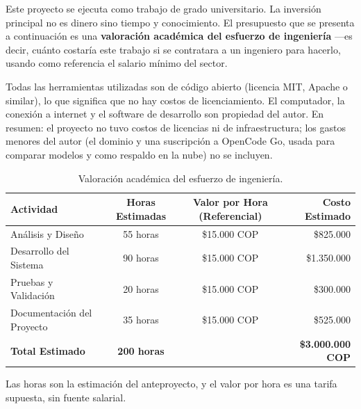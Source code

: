 



Este proyecto se ejecuta como trabajo de grado universitario. La inversión principal no es dinero sino tiempo y conocimiento. El presupuesto que se presenta a continuación es una \textbf{valoración académica del esfuerzo de ingeniería} ---es decir, cuánto costaría este trabajo si se contratara a un ingeniero para hacerlo, usando como referencia el salario mínimo del sector.

Todas las herramientas utilizadas son de código abierto (licencia MIT, Apache o similar), lo que significa que no hay costos de licenciamiento. El computador, la conexión a internet y el software de desarrollo son propiedad del autor. En resumen: el proyecto no tuvo costos de licencias ni de infraestructura; los gastos menores del autor (el dominio y una suscripción a OpenCode Go, usada para comparar modelos y como respaldo en la nube) no se incluyen.

\begin{table}[!htbp]
\centering
\caption{Valoración académica del esfuerzo de ingeniería.}
\label{tab:costo_academico}
\begin{tabular}{|l|c|c|r|}
\hline
\textbf{Actividad} & \textbf{Horas Estimadas} & \textbf{Valor por Hora (Referencial)} & \textbf{Costo Estimado} \\ \hline
Análisis y Diseño & 55 horas & \$15.000 COP & \$825.000 \\ 
Desarrollo del Sistema & 90 horas & \$15.000 COP & \$1.350.000 \\ 
Pruebas y Validación & 20 horas & \$15.000 COP & \$300.000 \\ 
Documentación del Proyecto & 35 horas & \$15.000 COP & \$525.000 \\ \hline
\textbf{Total Estimado} & \textbf{200 horas} & & \textbf{\$3.000.000 COP} \\ \hline
\end{tabular}
\end{table}

\noindent Las horas son la estimación del anteproyecto, y el valor por hora es una tarifa supuesta, sin fuente salarial.

